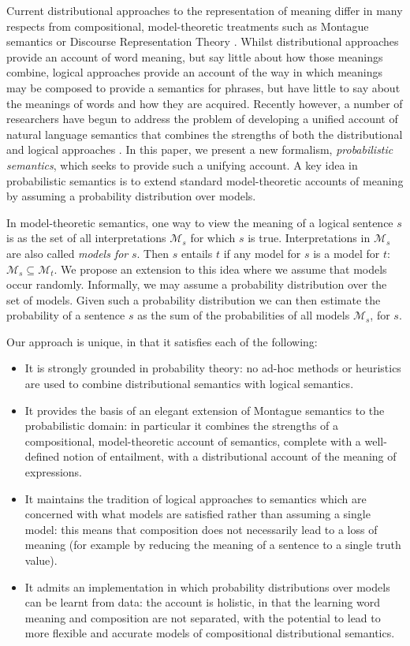 \documentclass[letterpaper]{article}
\begin{document}
Current distributional approaches to the representation of meaning differ in many respects from compositional, model-theoretic treatments
such as Montague semantics or
Discourse Representation Theory \cite{Blackburn:05}. Whilst distributional approaches provide an account of word meaning, but say little about how those meanings combine, logical approaches provide an account of the way in which meanings may be composed to provide a semantics for phrases, but have little to say about the meanings of words and how they are acquired.  Recently however, a number of researchers have begun to address the problem of  developing a unified account of natural language semantics that combines the strengths of both the distributional and logical approaches
\cite{Clarke:07,Coecke:10,Garrette:11,Lewis:13}.  In this paper, we present a new formalism, {\em probabilistic semantics\/}, which seeks to provide such a unifying
account. A key idea in probabilistic semantics is to extend standard model-theoretic
accounts of meaning by assuming a probability distribution over
models.  

In model-theoretic semantics, one way to view the meaning
of a logical sentence $s$ is as the set of all interpretations
$\mathcal{M}_s$ for which $s$ is true. Interpretations in $\mathcal{M}_s$ are also called {\em models for\/}
$s$. Then $s$ entails $t$ if any model for $s$ is a model for $t$: $\mathcal{M}_s \subseteq
\mathcal{M}_t$. We propose an extension to this idea where we assume
that models occur randomly. Informally, we may assume a probability
distribution over the set of models. Given such a probability distribution we can then estimate the
probability of a sentence $s$ as the sum of the probabilities of all
models $\mathcal{M}_s$, for $s$. 


Our approach is unique, in that it satisfies each of the following:
\begin{itemize}
\item It is strongly grounded in probability theory: no ad-hoc methods
  or heuristics are used to combine distributional semantics with
  logical semantics.
\item It provides the basis of an elegant extension of Montague semantics to the
  probabilistic domain: in particular it combines the strengths of a compositional, model-theoretic account of semantics, complete with a well-defined notion of entailment, with a distributional account of the meaning of expressions.
\item It maintains the tradition of logical approaches to semantics
  which are concerned with what models are satisfied rather than
  assuming a single model: this means that composition does not
  necessarily lead to a loss of meaning (for example by reducing the meaning of a
  sentence to a single truth value).
 \item It admits an implementation in which probability
distributions over models can be learnt from data: the account is holistic, in that the learning word meaning and composition are not separated, with
  the potential to lead to more flexible and accurate models of
  compositional distributional semantics.
\end{itemize}
\end{document}
